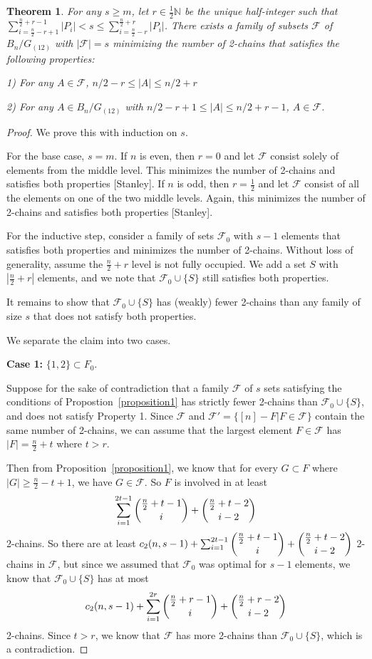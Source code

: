 \documentclass[12pt]{article}
\theoremstyle{plain}
\newtheorem{theorem}{Theorem}
\theoremstyle{definition}
\theoremstyle{remark}
\newcommand{\F}{\mathcal{F}}
\begin{document}
\begin{theorem} For any $s \geq m$, let $r \in \frac{1}{2}\mathbb{N}$ be the unique half-integer such that $\sum_{i = \frac{n}{2} - r +1}^{\frac{n}{2} + r -1} |P_i| < s \leq \sum_{i = \frac{n}{2}-r}^{\frac{n}{2}+r}|P_i|$. There exists a family of subsets $\F$ of $B_n / G_{(12)}$ with $|\F| = s$ minimizing the number of 2-chains that satisfies the following properties:

1) For any $A \in \F$, $n/2 - r \leq |A| \leq n/2 + r$

2) For any $A \in B_n / G_{(12)}$ with $n/2 - r + 1 \leq |A| \leq n/2 + r - 1$, $A \in \F$.
\end{theorem}

\begin{proof}
We prove this with induction on $s$.

For the base case, $s = m$. If $n$ is even, then $r = 0$ and let $\F$ consist solely of elements from the middle level. This minimizes the number of 2-chains and satisfies both properties [Stanley]. If $n$ is odd, then $r = \frac{1}{2}$ and let $\F$ consist of all the elements on one of the two middle levels. Again, this minimizes the number of 2-chains and satisfies both properties [Stanley].

For the inductive step, consider a family of sets $\F_0$ with $s-1$ elements that satisfies both properties and minimizes the number of 2-chains. Without loss of generality, assume the $\frac{n}{2}+r$ level is not fully occupied. We add a set $S$ with $|\frac{n}{2} + r|$ elements, and we note that $\F_0 \cup \{S\}$ still satisfies both properties.

It remains to show that $\F_0 \cup \{S\}$ has (weakly) fewer 2-chains than any family of size $s$ that does not satisfy both properties.

We separate the claim into two cases.

\textbf{Case 1:} $\{1, 2\} \subset F_0$.

Suppose for the sake of contradiction that a family $\F$ of $s$ sets satisfying the conditions of Propostion~\ref{proposition1} has strictly fewer 2-chains than $\F_0 \cup \{S\}$, and does not satisfy Property 1. Since $\F$ and $\F' = \{ [n] - F | F \in \F \}$ contain the same number of 2-chains, we can assume that the largest element $F \in \F$ has $|F| = \frac{n}{2} + t$ where $t > r$. 

Then from Proposition~\ref{proposition1}, we know that for every $G \subset F$ where $|G| \geq \frac{n}{2}-t+1$, we have $G \in \F$. So $F$ is involved in at least
\[ \sum_{i=1}^{2t-1} \dbinom{\frac{n}{2}+t - 1}{i} + \dbinom{\frac{n}{2}+t-2}{i-2}\]
2-chains. So there are at least $c_2(n, s-1) + \sum_{i=1}^{2t-1} \dbinom{\frac{n}{2}+t - 1}{i} + \dbinom{\frac{n}{2}+t-2}{i-2}$ 2-chains in $\F$, but since we assumed that $\F_0$ was optimal for $s-1$ elements, we know that $\F_0 \cup \{S\}$ has at most
\[ c_2(n, s-1) + \sum_{i=1}^{2r} \dbinom{\frac{n}{2}+r - 1}{i} + \dbinom{\frac{n}{2}+r-2}{i-2} \]
2-chains.
Since $t > r$, we know that $\F$ has more 2-chains than $\F_0 \cup \{S\}$, which is a contradiction.


\end{proof}
\end{document}
